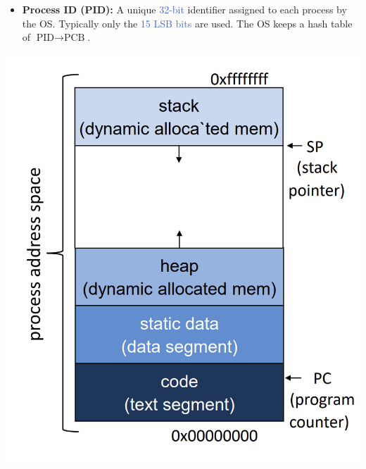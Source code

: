 \documentclass[openany,12pt]{book}
\newcommand{\blue}[1]{\textcolor{RoyalBlue}{#1}}
\begin{document}
\begin{center}
\begin{minipage}[t]{0.6\textwidth}
\begin{itemize}
      \item \textbf{Process ID (PID):} A unique \blue{32-bit} identifier assigned to each process by the OS. Typically only the \blue{15 LSB bits} are used. The OS keeps a hash table of \(\text{PID}\rightarrow\text{PCB}\).
    \end{itemize}
  \end{minipage}%
  \hspace{1em}
  \begin{minipage}[t]{0.35\textwidth}
    \vspace{0pt} %
    \centering
    \includegraphics[width=\linewidth]{../Assets/process_memory.png}
  \end{minipage}
\end{center}
\end{document}
